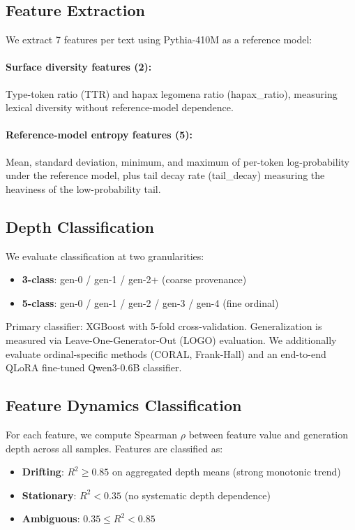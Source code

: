 \documentclass[11pt,a4paper]{article}
\begin{document}
\subsection{Feature Extraction}

We extract 7 features per text using Pythia-410M as a reference model:

\paragraph{Surface diversity features (2):} Type-token ratio (TTR) and hapax legomena ratio (hapax\_ratio), measuring lexical diversity without reference-model dependence.

\paragraph{Reference-model entropy features (5):} Mean, standard deviation, minimum, and maximum of per-token log-probability under the reference model, plus tail decay rate (tail\_decay) measuring the heaviness of the low-probability tail.

\subsection{Depth Classification}

We evaluate classification at two granularities:
\begin{itemize}
    \item \textbf{3-class}: gen-0 / gen-1 / gen-2+ (coarse provenance)
    \item \textbf{5-class}: gen-0 / gen-1 / gen-2 / gen-3 / gen-4 (fine ordinal)
\end{itemize}

Primary classifier: XGBoost with 5-fold cross-validation. Generalization is measured via Leave-One-Generator-Out (LOGO) evaluation. We additionally evaluate ordinal-specific methods (CORAL, Frank-Hall) and an end-to-end QLoRA fine-tuned Qwen3-0.6B classifier.

\subsection{Feature Dynamics Classification}

For each feature, we compute Spearman $\rho$ between feature value and generation depth across all samples. Features are classified as:
\begin{itemize}
    \item \textbf{Drifting}: $R^2 \geq 0.85$ on aggregated depth means (strong monotonic trend)
    \item \textbf{Stationary}: $R^2 < 0.35$ (no systematic depth dependence)
    \item \textbf{Ambiguous}: $0.35 \leq R^2 < 0.85$
\end{itemize}
\end{document}
